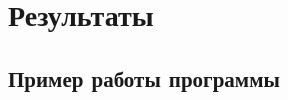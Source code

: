 \section*{Результаты}

\subsection*{Пример работы программы}

\begin{lstlisting}

\end{lstlisting}


\pagebreak